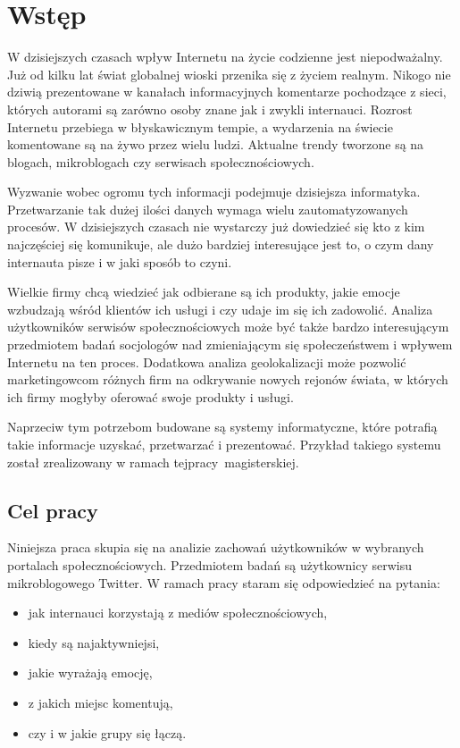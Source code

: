 \chapter{Wstęp}
\label{sec:wstęp}
W dzisiejszych czasach wpływ Internetu na życie codzienne jest niepodważalny.
Już od kilku lat świat globalnej wioski przenika się z życiem realnym.
Nikogo nie dziwią prezentowane w kanałach informacyjnych komentarze
pochodzące z sieci, których autorami są zarówno osoby znane jak i zwykli
internauci. Rozrost Internetu przebiega w błyskawicznym tempie, a wydarzenia na
świecie komentowane są na żywo przez wielu ludzi. Aktualne trendy tworzone są na
blogach, mikroblogach czy serwisach społecznościowych.

Wyzwanie wobec ogromu tych informacji podejmuje dzisiejsza informatyka.
Przetwarzanie tak dużej ilości danych wymaga wielu zautomatyzowanych procesów.
W dzisiejszych czasach nie wystarczy już dowiedzieć się kto z kim najczęściej
się komunikuje, ale dużo bardziej interesujące jest to, o czym dany internauta
pisze i w jaki sposób to czyni.

Wielkie firmy chcą wiedzieć jak odbierane są ich produkty, jakie emocje
wzbudzają wśród klientów ich usługi i czy udaje im się ich zadowolić.
Analiza użytkowników serwisów społecznościowych może być także bardzo
interesującym przedmiotem badań socjologów nad zmieniającym się społeczeństwem i
wpływem Internetu na ten proces.
Dodatkowa analiza geolokalizacji może pozwolić marketingowcom różnych firm na
odkrywanie nowych rejonów świata, w których ich firmy mogłyby oferować swoje
produkty i usługi.

Naprzeciw tym potrzebom budowane są systemy informatyczne, które potrafią takie
informacje uzyskać, przetwarzać i prezentować. Przykład takiego systemu został
zrealizowany w ramach tej\linebreak pracy~magisterskiej.

\section{Cel pracy}
Niniejsza praca skupia się na analizie zachowań użytkowników w wybranych
portalach społecznościowych. Przedmiotem badań są użytkownicy serwisu
mikroblogowego Twitter. W ramach pracy staram się
odpowiedzieć na pytania:
\begin{itemize}
  \item jak internauci korzystają z mediów społecznościowych,
  \item kiedy są najaktywniejsi,
  \item jakie wyrażają emocję,
  \item z jakich miejsc komentują,
  \item czy i w jakie grupy się łączą.
\end{itemize}

